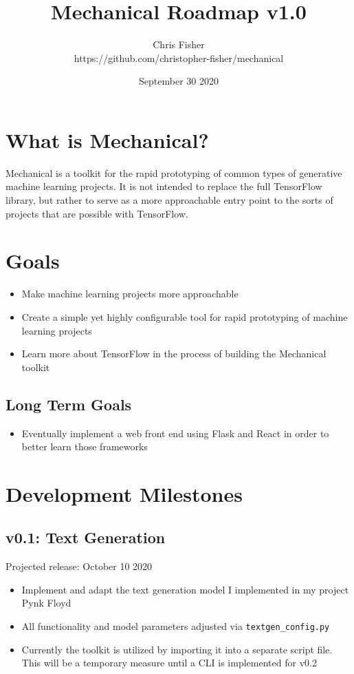 \documentclass{article}
\title{Mechanical Roadmap v1.0}
\author{Chris Fisher
\\https://github.com/christopher-fisher/mechanical}
\date{September 30 2020}
\def\code#1{\texttt{#1}}
\begin{document}
\maketitle

\section{What is Mechanical?}
Mechanical is a toolkit for the rapid prototyping of common types of generative machine learning projects. It is not intended to replace the full TensorFlow library, but rather to serve as a more approachable entry point to the sorts of projects that are possible with TensorFlow.


\section{Goals}
\begin{itemize}
    \item Make machine learning projects more approachable
    \item Create a simple yet highly configurable tool for rapid prototyping of machine learning projects
    \item Learn more about TensorFlow in the process of building the Mechanical toolkit
\end{itemize}
\subsection{Long Term Goals}
\begin{itemize}
    \item Eventually implement a web front end using Flask and React in order to better learn those frameworks
\end{itemize}

\section{Development Milestones}
\subsection{v0.1: Text Generation}
Projected release: October 10 2020
\begin{itemize}
    \item Implement and adapt the text generation model I implemented in my project Pynk Floyd
    \item All functionality and model parameters adjusted via \code{textgen\_config.py}
    \item Currently the toolkit is utilized by importing it into a separate script file. This will be a temporary measure until a CLI is implemented for v0.2
\end{itemize}
\end{document}
